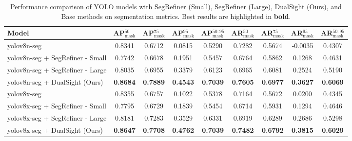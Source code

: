 
\begin{table*}[h!]
\centering
\begin{adjustbox}{width=\textwidth}
\begin{tabular}{@{}l|c|c|c|c|c|c|c|c@{}}
\toprule
\textbf{Model} & \textbf{AP$^{50}_{\text{mask}}$} & \textbf{AP$^{75}_{\text{mask}}$} & \textbf{AP$^{95}_{\text{mask}}$} & \textbf{AP$^{50:95}_{\text{mask}}$} & \textbf{AR$^{50}_{\text{mask}}$} & \textbf{AR$^{75}_{\text{mask}}$} & \textbf{AR$^{95}_{\text{mask}}$} & \textbf{AR$^{50:95}_{\text{mask}}$} \\ \midrule
yolov8n-seg & 0.8341 & 0.6712 & 0.0815 & 0.5290 & 0.7282 & 0.5674 & -0.0035 & 0.4307 \\ 
yolov8n-seg + SegRefiner - Small & 0.7742 & 0.6678 & 0.1951 & 0.5457 & 0.6764 & 0.5862 & 0.1268 & 0.4631 \\ 
yolov8n-seg + SegRefiner - Large & 0.8035 & 0.6955 & 0.3379 & 0.6123 & 0.6965 & 0.6081 & 0.2524 & 0.5190 \\ 
yolov8n-seg + DualSight (Ours) & \textbf{0.8684} & \textbf{0.7889} & \textbf{0.4543} & \textbf{0.7039} & \textbf{0.7605} & \textbf{0.6977} & \textbf{0.3627} & \textbf{0.6069} \\ 
\midrule
yolov8x-seg & 0.8355 & 0.6757 & 0.1022 & 0.5378 & 0.7164 & 0.5672 & 0.0200 & 0.4345 \\ 
yolov8x-seg + SegRefiner - Small & 0.7795 & 0.6729 & 0.1839 & 0.5454 & 0.6714 & 0.5931 & 0.1294 & 0.4646 \\ 
yolov8x-seg + SegRefiner - Large & 0.8181 & 0.7283 & 0.3529 & 0.6331 & 0.6919 & 0.6289 & 0.2686 & 0.5298 \\ 
yolov8x-seg + DualSight (Ours) & \textbf{0.8647} & \textbf{0.7708} & \textbf{0.4762} & \textbf{0.7039} & \textbf{0.7482} & \textbf{0.6792} & \textbf{0.3815} & \textbf{0.6029} \\ 

\bottomrule
\end{tabular}
\end{adjustbox}
\caption{Performance comparison of YOLO models with SegRefiner (Small), SegRefiner (Large), DualSight (Ours), and Base methods on segmentation metrics. Best results are highlighted in \textbf{bold}.}
\label{tab:performance_comparison}
\end{table*}
